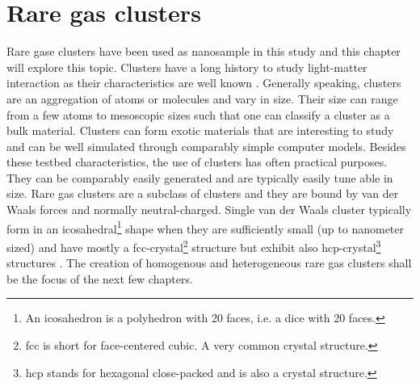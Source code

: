 \section{Rare gas clusters}
Rare gase clusters have been used as nanosample in this study and this chapter will explore this topic. Clusters have a long history to study light-matter interaction as their characteristics are well known \cite{Haberland-1994-Springer}. Generally speaking, clusters are an aggregation of atoms or molecules and vary in size. Their size can range from a few atoms to mesoscopic sizes such that one can classify a cluster as a bulk material. Clusters can form exotic materials that are interesting to study and can be well simulated through comparably simple computer models. Besides these testbed characteristics, the use of clusters has often practical purposes. They can be comparably easily generated and are typically easily tune able in size. Rare gas clusters are a subclass of clusters and they are bound by van der Waals forces and normally neutral-charged. Single van der Waals cluster typically form in an icosahedral\footnote{An icosahedron is a polyhedron with 20 faces, i.e. a dice with 20 faces.} shape when they are sufficiently small (up to nanometer sized) \cite{Miehle-1989-JCP} and have mostly a fcc-crystal\footnote{fcc is short for face-centered cubic. A very common crystal structure.} structure but exhibit also hcp-crystal\footnote{hcp stands for hexagonal close-packed and is also a crystal structure.} structures \cite{VanDeWaal-1993-JCP,Krainyukova-2006-TSF}. The creation of homogenous and heterogeneous rare gas clusters shall be the focus of the next few chapters.
